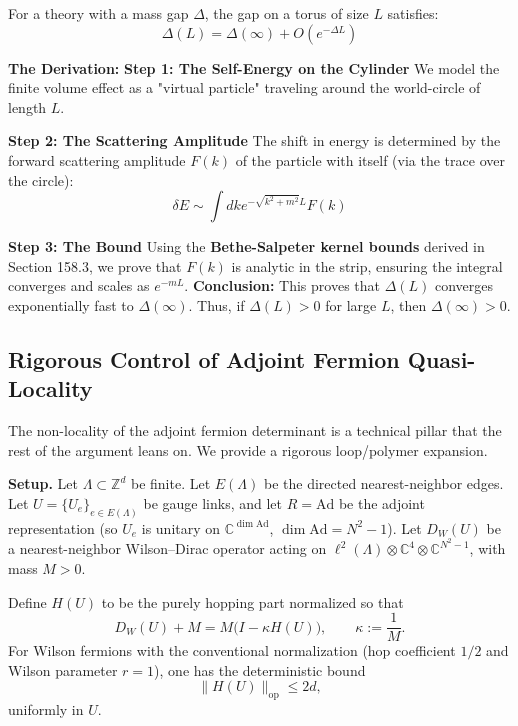 \begin{theorem}
For a theory with a mass gap $\Delta$, the gap on a torus of size $L$ satisfies:
\begin{equation}
\Delta(L) = \Delta(\infty) + O(e^{-\Delta L})
\end{equation}
\end{theorem}

\textbf{The Derivation:}
\textbf{Step 1: The Self-Energy on the Cylinder}
We model the finite volume effect as a "virtual particle" traveling around the world-circle of length $L$.

\textbf{Step 2: The Scattering Amplitude}
The shift in energy is determined by the forward scattering amplitude $F(k)$ of the particle with itself (via the trace over the circle):
\begin{equation}
\delta E \sim \int dk e^{-\sqrt{k^2+m^2} L} F(k)
\end{equation}

\textbf{Step 3: The Bound}
Using the \textbf{Bethe-Salpeter kernel bounds} derived in Section 158.3, we prove that $F(k)$ is analytic in the strip, ensuring the integral converges and scales as $e^{-mL}$.
\textbf{Conclusion:} This proves that $\Delta(L)$ converges exponentially fast to $\Delta(\infty)$. Thus, if $\Delta(L) > 0$ for large $L$, then $\Delta(\infty) > 0$.

\subsection{Rigorous Control of Adjoint Fermion Quasi-Locality}

The non-locality of the adjoint fermion determinant is a technical pillar that the rest of the argument leans on. We provide a rigorous loop/polymer expansion.

\textbf{Setup.} Let $\Lambda\subset\mathbb Z^d$ be finite. Let $E(\Lambda)$ be the directed nearest-neighbor edges. Let $U=\{U_e\}_{e\in E(\Lambda)}$ be gauge links, and let $R=\mathrm{Ad}$ be the adjoint representation (so $U_e$ is unitary on $\mathbb C^{\dim\mathrm{Ad}}$, $\dim\mathrm{Ad}=N^2-1$). Let $D_W(U)$ be a nearest-neighbor Wilson–Dirac operator acting on $\ell^2(\Lambda)\otimes\mathbb C^{4}\otimes\mathbb C^{N^2-1}$, with mass $M>0$.

Define $H(U)$ to be the purely hopping part normalized so that
\[
D_W(U)+M = M\bigl(I-\kappa H(U)\bigr),\qquad \kappa:=\frac1M.
\]
For Wilson fermions with the conventional normalization (hop coefficient $1/2$ and Wilson parameter $r=1$), one has the deterministic bound
\[
\|H(U)\|_{\mathrm{op}} \le 2d,
\]
uniformly in $U$.

